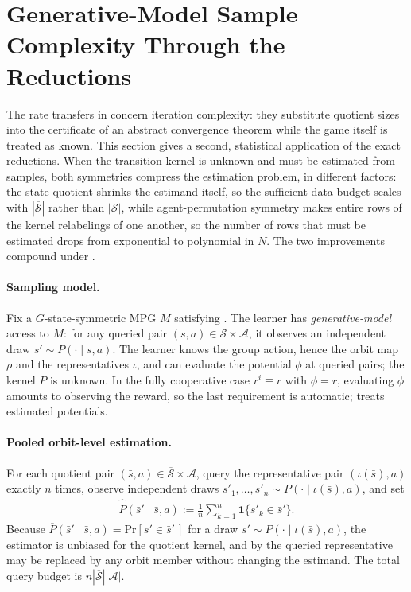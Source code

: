 \documentclass{article}
\theoremstyle{plain}
\theoremstyle{definition}
\theoremstyle{remark}
\renewcommand{\Pr}{\mathrm{Pr}}
\newcommand{\St}{\mathcal{S}}
\newcommand{\Ac}{\mathcal{A}}
\newcommand{\abs}[1]{\left\lvert#1\right\rvert}
\newcommand{\quotient}[1]{\overline{#1}}
\newcommand{\hatP}{\widehat{\quotient P}}
\begin{document}
\section{Generative-Model Sample Complexity Through the Reductions}
\label{sec:sample-complexity}

The rate transfers in
concern iteration complexity: they substitute quotient sizes into the
certificate of an abstract convergence theorem while the game itself is treated
as known. This section gives a second, statistical application of the
exact reductions. When the transition kernel is unknown and must be estimated
from samples, both symmetries compress the estimation problem, in different
factors: the state quotient shrinks the estimand itself, so the sufficient
data budget scales with $\abs{\quotient\St}$ rather than $\abs\St$, while
agent-permutation symmetry makes entire rows of the kernel relabelings of one
another, so the number of rows that must be estimated drops from exponential
to polynomial in $N$. The two improvements compound under
.

\paragraph{Sampling model.}
Fix a $G$-state-symmetric MPG $M$ satisfying
. The learner has
\emph{generative-model} access to $M$: for any queried pair
$(s,a)\in\St\times\Ac$, it observes an independent draw
$s'\sim P(\cdot\mid s,a)$. The learner knows the group action, hence the orbit
map $\rho$ and the representatives $\iota$, and can evaluate the potential
$\phi$ at queried pairs; the kernel $P$ is unknown. In the fully cooperative
case $r^i\equiv r$ with $\phi=r$, evaluating $\phi$ amounts to observing the
reward, so the last requirement is automatic;
 treats estimated potentials.

\paragraph{Pooled orbit-level estimation.}
For each quotient pair $(\bar s,a)\in\quotient\St\times\Ac$, query the
representative pair $(\iota(\bar s),a)$ exactly $n$ times, observe independent
draws $s'_1,\ldots,s'_n\sim P(\cdot\mid\iota(\bar s),a)$, and set
\begin{align}
  \hatP(\bar s'\mid\bar s,a)
  :=
  \frac1n\sum_{k=1}^n\mathbf 1\{s'_k\in\bar s'\}.
  \label{eq:pooled-estimator}
\end{align}
Because
$\quotient P(\bar s'\mid\bar s,a)=\Pr[s'\in\bar s'\,]$ for a draw
$s'\sim P(\cdot\mid\iota(\bar s),a)$, the estimator is unbiased for the
quotient kernel, and by  the queried
representative may be replaced by any orbit member without changing the
estimand. The total query budget is $n\abs{\quotient\St}\abs\Ac$.
\end{document}
